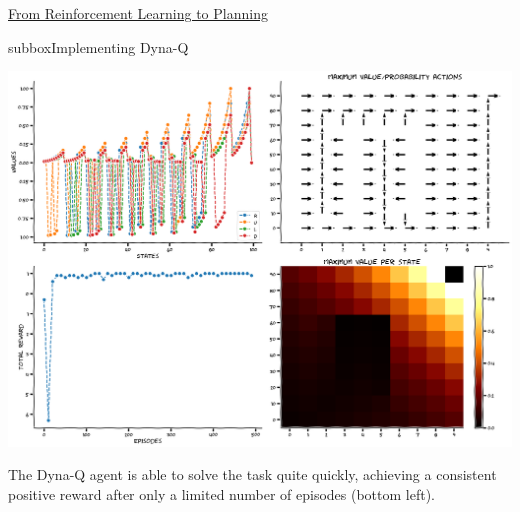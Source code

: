 \begin{textbox}{\href{https://compneuro.neuromatch.io/tutorials/W3D4_ReinforcementLearning/student/W3D4_Tutorial4.html}{From Reinforcement Learning to Planning } }
\begin{subbox}{subbox}{Implementing Dyna-Q}
\begin{center}
\includegraphics[scale=0.16]{Figures/RL/RL_Figure17.png}
\end{center}

The Dyna-Q agent is able to solve the task quite quickly, achieving a consistent positive reward after only a limited number of episodes (bottom left).

\end{subbox}
\end{textbox}
